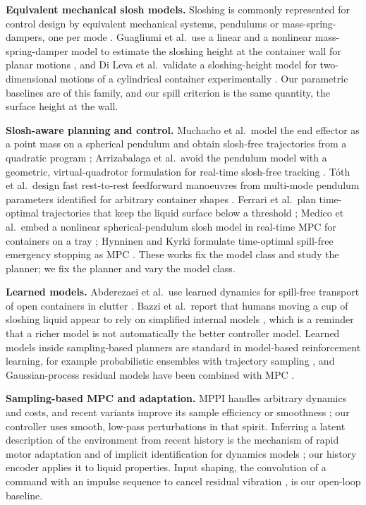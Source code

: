 \textbf{Equivalent mechanical slosh models.} Sloshing is commonly represented for control design by equivalent mechanical systems, pendulums or mass-spring-dampers, one per mode \cite{capolupo2025equivalent}. Guagliumi et al.\ use a linear and a nonlinear mass-spring-damper model to estimate the sloshing height at the container wall for planar motions \cite{guagliumi2021simple}, and Di Leva et al.\ validate a sloshing-height model for two-dimensional motions of a cylindrical container experimentally \cite{leva2022sloshing}. Our parametric baselines are of this family, and our spill criterion is the same quantity, the surface height at the wall.

\textbf{Slosh-aware planning and control.} Muchacho et al.\ model the end effector as a point mass on a spherical pendulum and obtain slosh-free trajectories from a quadratic program \cite{muchacho2022solution}; Arrizabalaga et al.\ avoid the pendulum model with a geometric, virtual-quadrotor formulation for real-time slosh-free tracking \cite{arrizabalaga2024geometric}. T\'oth et al.\ design fast rest-to-rest feedforward manoeuvres from multi-mode pendulum parameters identified for arbitrary container shapes \cite{toth2024rapid}. Ferrari et al.\ plan time-optimal trajectories that keep the liquid surface below a threshold \cite{ferrari2026time}; Medico et al.\ embed a nonlinear spherical-pendulum slosh model in real-time MPC for containers on a tray \cite{medico2026model}; Hynninen and Kyrki formulate time-optimal spill-free emergency stopping as MPC \cite{hynninen2026emergency}. These works fix the model class and study the planner; we fix the planner and vary the model class.

\textbf{Learned models.} Abderezaei et al.\ use learned dynamics for spill-free transport of open containers in clutter \cite{abderezaei2024clutter}. Bazzi et al.\ report that humans moving a cup of sloshing liquid appear to rely on simplified internal models \cite{bazzi2024simplified}, which is a reminder that a richer model is not automatically the better controller model. Learned models inside sampling-based planners are standard in model-based reinforcement learning, for example probabilistic ensembles with trajectory sampling \cite{chua2018deep}, and Gaussian-process residual models have been combined with MPC \cite{hewing2017cautious}.

\textbf{Sampling-based MPC and adaptation.} MPPI handles arbitrary dynamics and costs, and recent variants improve its sample efficiency or smoothness \cite{asmar2022model,kicki2025lp}; our controller uses smooth, low-pass perturbations in that spirit. Inferring a latent description of the environment from recent history is the mechanism of rapid motor adaptation \cite{kumar2021rma} and of implicit identification for dynamics models \cite{evans2022context}; our history encoder applies it to liquid properties. Input shaping, the convolution of a command with an impulse sequence to cancel residual vibration \cite{kotaniemi2025data}, is our open-loop baseline.
